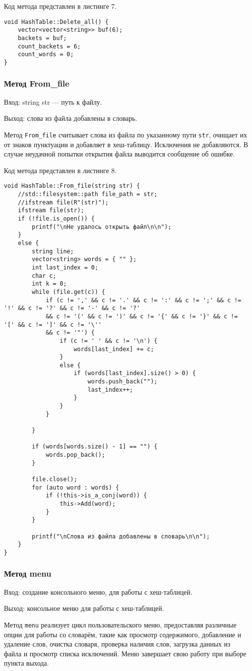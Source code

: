 \documentclass[10pt,a4paper,final]{article} %
\begin{document}
Код метода представлен в листинге 7. \begin{lstlisting}[label=deleteAllMethod, caption = Метод Delete\_all]
void HashTable::Delete_all() {
	vector<vector<string>> buf(6);
	backets = buf;
	count_backets = 6;
	count_words = 0;
} \end{lstlisting}



\subsubsection{Метод From\_file}
Вход: string str — путь к файлу. \par
Выход: слова из файла добавлены в словарь. \par
\par Метод \texttt{From\_file} считывает слова из файла по указанному пути \texttt{str}, очищает их от знаков пунктуации и добавляет в хеш-таблицу. Исключения не добавляются. В случае неудачной попытки открытия файла выводится сообщение об ошибке.

Код метода представлен в листинге 8. \begin{lstlisting}[label=fromFileMethod, caption = Метод From\_file]
void HashTable::From_file(string str) {
	//std::filesystem::path file_path = str;
	//ifstream file(R"(str)");
	ifstream file(str);
	if (!file.is_open()) {
		printf("\nНе удалось открыть файл\n\n");
	}
	else {
		string line;
		vector<string> words = { "" };
		int last_index = 0;
		char c;
		int k = 0;
		while (file.get(c)) {
			if (c != ',' && c != '.' && c != ':' && c != ';' && c != '!' && c != '?' && c != '-' && c != '?'
			&& c != '(' && c != ')' && c != '{' && c != '}' && c != '[' && c != ']' && c != '\''
			&& c != '"') {
				if (c != ' ' && c != '\n') {
					words[last_index] += c;
				}
				else {
					if (words[last_index].size() > 0) {
						words.push_back("");
						last_index++;
					}
				}
			}
			
		}
		
		if (words[words.size() - 1] == "") {
			words.pop_back();
		}
		
		file.close();
		for (auto word : words) {
			if (!this->is_a_conj(word)) {
				this->Add(word);
			}
		}
		
		printf("\nСлова из файла добавлены в словарь\n\n");
	}
}\end{lstlisting}


\subsubsection{Метод menu}
Вход: создание консольного меню, для работы с хеш-таблицей. \par
Выход: консольное меню для работы с хеш-таблицей. \par
\par Метод \texttt{menu} реализует цикл пользовательского меню, предоставляя различные опции для работы со словарём, такие как просмотр содержимого, добавление и удаление слов, очистка словаря, проверка наличия слов, загрузка данных из файла и просмотр списка исключений. Меню завершает свою работу при выборе пункта выхода.
\end{document}
